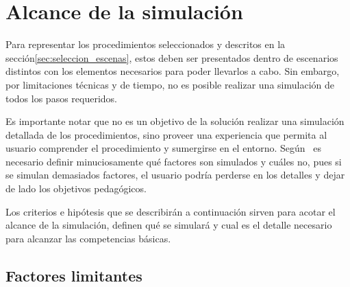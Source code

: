 \section{Alcance de la simulación}
\label{sec:alcance}

Para representar los procedimientos seleccionados y descritos en la
sección\ref{sec:seleccion_escenas}, estos deben ser presentados dentro de
escenarios distintos con los elementos necesarios para poder llevarlos a cabo.
Sin embargo, por limitaciones técnicas y de tiempo, no es posible
realizar una simulación de todos los pasos requeridos.


Es importante notar que no es un objetivo de la solución realizar una
simulación detallada de los procedimientos, sino proveer una experiencia que
permita al usuario comprender el procedimiento y sumergirse en el entorno.
Según~\cite{videojuegos:gonzaleztardon} es necesario definir minuciosamente
qué factores son simulados y cuáles no, pues si se simulan demasiados
factores, el usuario podría perderse en los detalles y dejar de lado los objetivos 
pedagógicos. 

Los criterios e hipótesis que se describirán a continuación sirven para acotar
el alcance de la simulación, definen qué se simulará y cual es el detalle
necesario para alcanzar las competencias básicas.



\subsection{Factores limitantes}

